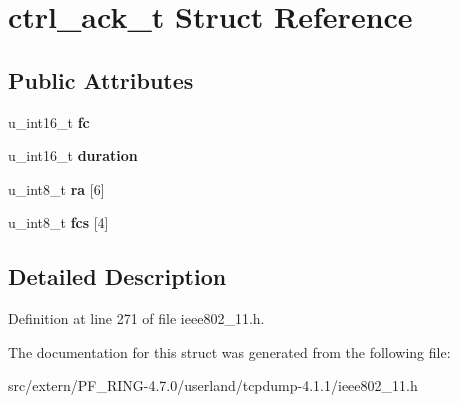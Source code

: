 \hypertarget{structctrl__ack__t}{
\section{ctrl\_\-ack\_\-t Struct Reference}
\label{structctrl__ack__t}
}
\subsection*{Public Attributes}
\begin{DoxyCompactItemize}
\item 
\hypertarget{structctrl__ack__t_ab3c83680c72716b8db110af0662d73a8}{
u\_\-int16\_\-t {\bfseries fc}}
\label{structctrl__ack__t_ab3c83680c72716b8db110af0662d73a8}

\item 
\hypertarget{structctrl__ack__t_a7ca245b4629a18d4f0b4737366619d9a}{
u\_\-int16\_\-t {\bfseries duration}}
\label{structctrl__ack__t_a7ca245b4629a18d4f0b4737366619d9a}

\item 
\hypertarget{structctrl__ack__t_ab0499a491231a29ad71055cdd5120473}{
u\_\-int8\_\-t {\bfseries ra} \mbox{[}6\mbox{]}}
\label{structctrl__ack__t_ab0499a491231a29ad71055cdd5120473}

\item 
\hypertarget{structctrl__ack__t_a8f6c1ad3fc904e068818c247ccae7e02}{
u\_\-int8\_\-t {\bfseries fcs} \mbox{[}4\mbox{]}}
\label{structctrl__ack__t_a8f6c1ad3fc904e068818c247ccae7e02}

\end{DoxyCompactItemize}


\subsection{Detailed Description}


Definition at line 271 of file ieee802\_\-11.h.



The documentation for this struct was generated from the following file:\begin{DoxyCompactItemize}
\item 
src/extern/PF\_\-RING-\/4.7.0/userland/tcpdump-\/4.1.1/ieee802\_\-11.h\end{DoxyCompactItemize}
